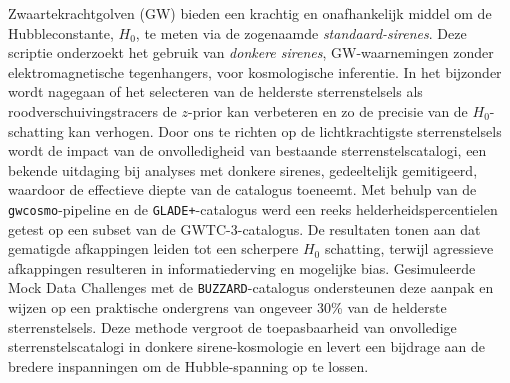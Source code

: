 \vspace*{-2mm}
Zwaartekrachtgolven (GW) bieden een krachtig en onafhankelijk middel om de Hubbleconstante, $H_0$, te meten via de zogenaamde \textit{standaard-sirenes}. Deze scriptie onderzoekt het gebruik van \textit{donkere sirenes}, GW-waarnemingen zonder elektromagnetische tegenhangers, voor kosmologische inferentie. In het bijzonder wordt nagegaan of het selecteren van de helderste sterrenstelsels als roodverschuivingstracers de $z$-prior kan verbeteren en zo de precisie van de $H_0$-schatting kan verhogen. Door ons te richten op de lichtkrachtigste sterrenstelsels wordt de impact van de onvolledigheid van bestaande sterrenstelscatalogi, een bekende uitdaging bij analyses met donkere sirenes, gedeeltelijk gemitigeerd, waardoor de effectieve diepte van de catalogus toeneemt. Met behulp van de \texttt{gwcosmo}-pipeline en de \texttt{GLADE+}-catalogus werd een reeks helderheidspercentielen getest op een subset van de GWTC-3-catalogus. De resultaten tonen aan dat gematigde afkappingen leiden tot een scherpere $H_0$ schatting, terwijl agressieve afkappingen resulteren in informatiederving en mogelijke bias. Gesimuleerde Mock Data Challenges met de \texttt{BUZZARD}-catalogus ondersteunen deze aanpak en wijzen op een praktische ondergrens van ongeveer 30\% van de helderste sterrenstelsels. Deze methode vergroot de toepasbaarheid van onvolledige sterrenstelscatalogi in donkere sirene-kosmologie en levert een bijdrage aan de bredere inspanningen om de Hubble-spanning op te lossen.
